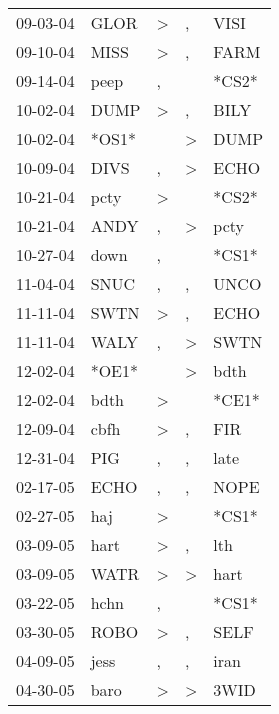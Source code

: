 \begin{supertabular}{lllll}
 09-03-04 &   GLOR &     \textgreater &                , &   VISI \\
 09-10-04 &   MISS &     \textgreater &                , &   FARM \\
 09-14-04 &   peep &                , &                  &  *CS2* \\
 10-02-04 &   DUMP &     \textgreater &                , &   BILY \\
 10-02-04 &  *OS1* &                  &     \textgreater &   DUMP \\
 10-09-04 &   DIVS &                , &     \textgreater &   ECHO \\
 10-21-04 &   pcty &     \textgreater &                  &  *CS2* \\
 10-21-04 &   ANDY &                , &     \textgreater &   pcty \\
 10-27-04 &   down &                , &                  &  *CS1* \\
 11-04-04 &   SNUC &                , &                , &   UNCO \\
 11-11-04 &   SWTN &     \textgreater &                , &   ECHO \\
 11-11-04 &   WALY &                , &     \textgreater &   SWTN \\
 12-02-04 &  *OE1* &                  &     \textgreater &   bdth \\
 12-02-04 &   bdth &     \textgreater &                  &  *CE1* \\
 12-09-04 &   cbfh &     \textgreater &                , &    FIR \\
 12-31-04 &    PIG &                , &                , &   late \\
 02-17-05 &   ECHO &                , &                , &   NOPE \\
 02-27-05 &    haj &     \textgreater &                  &  *CS1* \\
 03-09-05 &   hart &     \textgreater &                , &    lth \\
 03-09-05 &   WATR &     \textgreater &     \textgreater &   hart \\
 03-22-05 &   hchn &                , &                  &  *CS1* \\
 03-30-05 &   ROBO &     \textgreater &                , &   SELF \\
 04-09-05 &   jess &                , &                , &   iran \\
 04-30-05 &   baro &     \textgreater &     \textgreater &   3WID \\

\end{supertabular}
